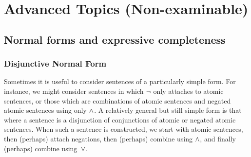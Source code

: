 \part{Advanced Topics (Non-examinable)}

\chapter{Normal forms and expressive completeness}
\label{ch:normalform}

\section{Disjunctive Normal Form}\label{s:DNFDefined}

Sometimes it is useful to consider sentences of a particularly simple form. For instance, we might consider sentences in which $\neg$ only attaches to atomic sentences, or those which are combinations of atomic sentences and negated atomic sentences using only $\wedge$.  A relatively general but still simple form is that where a sentence is a disjunction of conjunctions of atomic or negated atomic sentences.  When such a sentence is constructed, we start with atomic sentences, then (perhaps) attach negations, then (perhaps) combine using $\wedge$, and finally (perhaps) combine using~$\vee$. 

